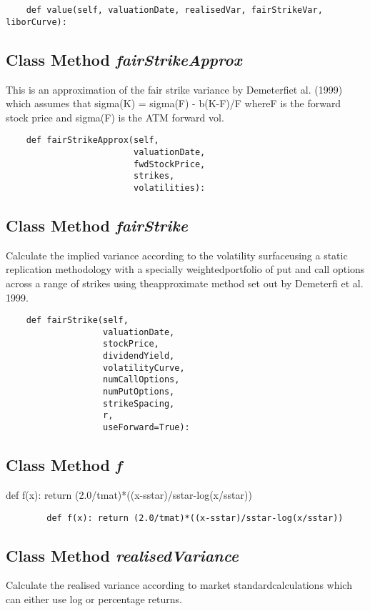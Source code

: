\documentclass[twoside,11pt]{book}
\begin{document}
\begin{lstlisting}
    def value(self, valuationDate, realisedVar, fairStrikeVar, liborCurve):
\end{lstlisting}

\subsection{Class Method {\it fairStrikeApprox}}
This is an approximation of the fair strike variance by Demeterfiet al. (1999) which assumes that sigma(K) = sigma(F) - b(K-F)/F whereF is the forward stock price and sigma(F) is the ATM forward vol. 

\begin{lstlisting}
    def fairStrikeApprox(self,
                         valuationDate,
                         fwdStockPrice,
                         strikes,
                         volatilities):
\end{lstlisting}

\subsection{Class Method {\it fairStrike}}
Calculate the implied variance according to the volatility surfaceusing a static replication methodology with a specially weightedportfolio of put and call options across a range of strikes using theapproximate method set out by Demeterfi et al. 1999. 

\begin{lstlisting}
    def fairStrike(self,
                   valuationDate,
                   stockPrice,
                   dividendYield,
                   volatilityCurve,
                   numCallOptions,
                   numPutOptions,
                   strikeSpacing,
                   r,
                   useForward=True):
\end{lstlisting}

\subsection{Class Method {\it f}}
def f(x): return (2.0/tmat)*((x-sstar)/sstar-log(x/sstar))

\begin{lstlisting}
        def f(x): return (2.0/tmat)*((x-sstar)/sstar-log(x/sstar))
\end{lstlisting}

\subsection{Class Method {\it realisedVariance}}
Calculate the realised variance according to market standardcalculations which can either use log or percentage returns.
\end{document}
